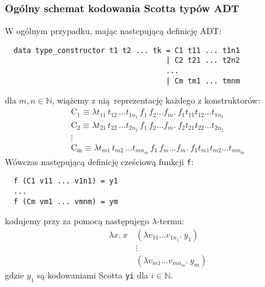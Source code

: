 \subsubsection{Ogólny schemat kodowania Scotta typów ADT}
W ogólnym przypadku, mając nastepującą definicję ADT:
\begin{verbatim}
  data type_constructor t1 t2 ... tk = C1 t11 ... t1n1
                                     | C2 t21 ... t2n2
                                     ...
                                     | Cm tm1 ... tmnm
\end{verbatim}
dla \(m, n \in \mathbb{N}\), wiążemy z nią reprezentację każdego z konstruktorów:
\begin{gather*}
  \mathrm{C_1} \equiv \lambda t_{11}\, t_{12}\, \dots t_{1n_1}\, f_1\, f_2 \dots f_m.\ f_1 t_{11} t_{12} \dots t_{1n_1}\\
  \mathrm{C_2} \equiv \lambda t_{21}\, t_{22}\, \dots t_{2n_2}\, f_1\, f_2 \dots f_m.\ f_2 t_{21} t_{22} \dots t_{2n_2}\\
 \vdots\\
  \mathrm{C_m} \equiv \lambda t_{m1}\, t_{m2}\, \dots t_{mn_m}\, f_1\, f_m \dots f_m.\ f_1 t_{m1} t_{m2} \dots t_{mn_m}
\end{gather*}
Wówczas następującą definicję cześciową funkcji \texttt{f}:
\begin{verbatim}
  f (C1 v11 ... v1n1) = y1
  ...
  f (Cm vm1 ... vmnm) = ym
\end{verbatim}
kodujemy przy za pomocą następujego \(\lambda\)-termu:
\begin{align*}
  \lambda x.\ x\,&(\lambda v_{11}\dots v_{1n_1}.\ y_1)\\
                 &\vdots\\
                 &(\lambda v_{m1}\dots v_{mn_m}.\ y_m)
\end{align*}
gdzie \(y_1\) są kodowaniami Scotta \texttt{yi} dla \(i\in\mathbb{N}\). 
